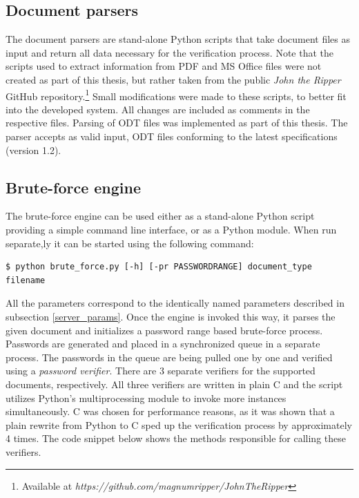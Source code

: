 \documentclass[11pt,oneside]{fithesis2}
\begin{document}
\subsection{Document parsers} \label{doc_parsers}

The document parsers are stand-alone Python scripts that take document files as input and return all  data necessary for the verification process. Note that the scripts used to extract information from PDF and MS Office files were not created as part of this thesis, but rather taken from the public \textit{John the Ripper} GitHub repository.\footnote{Available at \textit{https://github.com/magnumripper/JohnTheRipper}} Small modifications were made to these scripts, to better fit into the developed system. All changes are included as comments in the respective files. Parsing of ODT files was implemented as part of this thesis. The parser accepts as valid input, ODT files conforming to the latest specifications (version 1.2).

\subsection{Brute-force engine}\label{brute_force_engine}

The brute-force engine can be used either as a stand-alone Python script providing a simple command line interface, or as a Python module. When run separate,ly it can be started using the following command:

\begin{lstlisting}
$ python brute_force.py [-h] [-pr PASSWORDRANGE] document_type filename
\end{lstlisting}

All the parameters correspond to the identically named parameters described in subsection \ref{server_params}. Once the engine is invoked this way, it parses the given document and initializes a password range based brute-force process. Passwords are generated and placed in a synchronized queue in a separate process. The passwords in the queue are being pulled one by one and verified using a \textit{password verifier}. There are 3 separate verifiers for the supported documents, respectively. All three verifiers are written in plain C and the script utilizes Python's multiprocessing module to invoke more instances simultaneously. C was chosen for performance reasons, as it was shown that a plain rewrite from Python to C sped up the verification process by approximately 4 times. The code snippet below shows the methods responsible for calling these verifiers.
\end{document}
